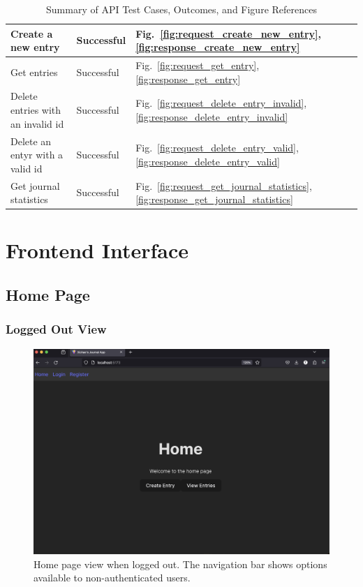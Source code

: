 \begin{table}[H]
\begin{tabular}{|l|l|l|}
Create a new entry                             & Successful      & Fig.~\ref{fig:request_create_new_entry}, \ref{fig:response_create_new_entry} \\ \hline
Get entries                                   & Successful      & Fig.~\ref{fig:request_get_entry}, \ref{fig:response_get_entry} \\ \hline
Delete entries with an invalid id             & Successful      & Fig.~\ref{fig:request_delete_entry_invalid}, \ref{fig:response_delete_entry_invalid} \\ \hline
Delete an entyr with a valid id                & Successful      & Fig.~\ref{fig:request_delete_entry_valid}, \ref{fig:response_delete_entry_valid} \\ \hline
Get journal statistics                         & Successful      & Fig.~\ref{fig:request_get_journal_statistics}, \ref{fig:response_get_journal_statistics} \\ \hline
\end{tabular}
\caption{Summary of API Test Cases, Outcomes, and Figure References}
\label{table:test_cases_summary}
\end{table}

\newpage

\section{Frontend Interface}    
\subsection{Home Page}

\subsubsection{Logged Out View}
\begin{figure}[H]
\centering
\includegraphics[width=\linewidth]{Assets/UI-home.png}
\caption{Home page view when logged out. The navigation bar shows options available to non-authenticated users.}
\label{fig:uihomeloggedout}
\end{figure}

